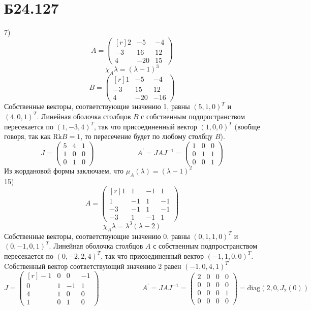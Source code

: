 \documentclass[a4paper,12pt]{article} %
\begin{document}
\section*{Б24.127}
7)$$A=\begin{pmatrix*}[r]
    2&-5&-4\\
    -3&16&12\\
    4&-20&15
\end{pmatrix*}$$
$$\chi_A{\lambda}=(\lambda-1)^3$$
$$B=\begin{pmatrix*}[r]
    1&-5&-4\\
    -3&15&12\\
    4&-20&-16
\end{pmatrix*}$$
Собственные векторы, соответствующие значению 1, равны $(5,1,0)^{T}$ и $(4,0,1)^{T}$. Линейная оболочка столбцов $B$ с собственным подпространством пересекается по $(1,-3,4)^{T}$, так что присоединенный вектор $(1,0,0)^{T}$ (вообще говоря, так как $\mathrm{Rk}B=1$, то пересечение будет по любому столбцу $B$).
$$J=\begin{pmatrix*}
    5&4&1\\
    1&0&0\\
    0&1&0
\end{pmatrix*}\qquad\qquad\qquad A^{\prime}=JAJ^{-1}=\begin{pmatrix*}
    1&0&0\\
    0&1&1\\
    0&0&1
\end{pmatrix*}$$
Из жордановой формы заключаем, что $\mu_A(\lambda)=(\lambda-1)^2$\\
15)$$A=\begin{pmatrix*}[r]
    1&1&-1&1\\
    1&-1&1&-1\\
    -3&-1&1&-1\\
    -3&1&-1&1
\end{pmatrix*}$$
$$\chi_A{\lambda}=\lambda^3(\lambda-2)$$
Собственные векторы, соответствующие значению 0, равны $(0,1,1,0)^{T}$ и $(0,-1,0,1)^{T}$. Линейная оболочка столбцов $A$ с собственным подпространством пересекается по $(0,-2,2,4)^{T}$, так что присоединенный вектор $(-1,1,0,0)^{T}$. Cобственный вектор соответствующий значению 2 равен $(-1,0,4,1)^{T}$
$$J=\begin{pmatrix*}[r]
    -1&0&0&-1\\
    0&1&-1&1\\
    4&1&0&0\\
    1&0&1&0
\end{pmatrix*}\qquad\qquad\qquad A^{\prime}=JAJ^{-1}=\begin{pmatrix*}
    2&0&0&0\\
    0&0&0&0\\
    0&0&0&1\\
    0&0&0&0
\end{pmatrix*}=\mathrm{diag}(2,0,J_2(0))$$
\end{document}
